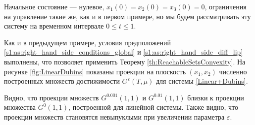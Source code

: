 \documentclass[../main.tex]{subfiles}
\begin{document}
 Начальное состояние --- нулевое, $x_1(0) = x_2(0) = x_3(0) = 0$, ограничения на управление такие же, как и в первом примере, но мы будем рассматривать эту систему на временном интервале $0 \leqslant t \leqslant 1$.
 
 Как и в предыдущем примере, условия предположений \ref{s1:as:right_hand_side_conditions_global} и \ref{s1:as:right_hand_side_diff_lip} выполнены, что позволяет применить Теорему \ref{th:ReachableSetsConvexity}. 
 На рисунке \ref{fig:LinearDubins} показаны проекции на плоскость $(x_1,x_2)$ численно построенных множеств достижимости $G^{\varepsilon}(T,\mu)$ для системы \eqref{Linear+Dubins}. 
 
 Видно, что проекции множеств $G^{0.001}(1,1) $ и $G^{0.01}(1,1) $ близки к проекции множества $G^{0}(1,1) $, построенной для линейной системы. 
 Также видно, что проекции множеств становятся невыпуклыми при увеличении параметра $\varepsilon$. 
\end{document}

